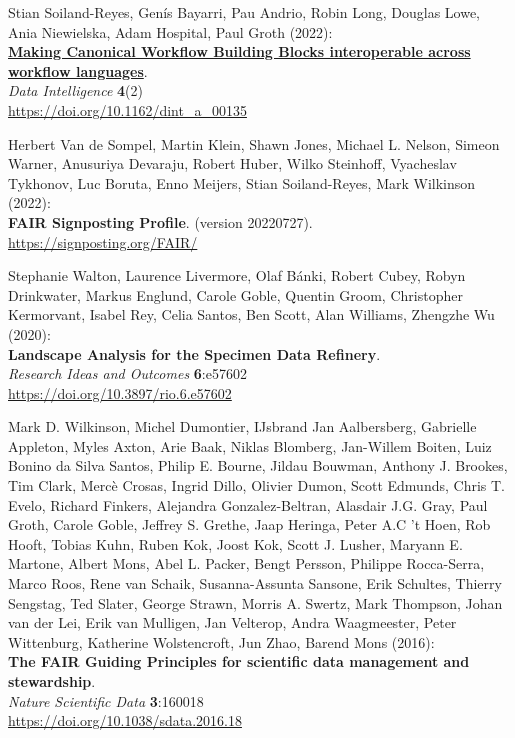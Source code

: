 \begin{thebibliography}{9}
 Stian Soiland-Reyes, Genís Bayarri, Pau
Andrio, Robin Long, Douglas Lowe, Ania Niewielska, Adam Hospital, Paul
Groth (2022):\\
\href{../canonical-workflow-building-blocks/}{\textbf{Making Canonical
Workflow Building Blocks interoperable across workflow languages}}.\\
\emph{Data Intelligence} \textbf{4}(2)\\
\url{https://doi.org/10.1162/dint_a_00135}

 Herbert Van de Sompel, Martin Klein, Shawn
Jones, Michael L. Nelson, Simeon Warner, Anusuriya Devaraju, Robert
Huber, Wilko Steinhoff, Vyacheslav Tykhonov, Luc Boruta, Enno Meijers,
Stian Soiland-Reyes, Mark Wilkinson (2022):\\
\textbf{FAIR Signposting Profile}. (version 20220727).\\
\url{https://signposting.org/FAIR/}

 Stephanie Walton, Laurence Livermore, Olaf Bánki,
Robert Cubey, Robyn Drinkwater, Markus Englund, Carole Goble, Quentin
Groom, Christopher Kermorvant, Isabel Rey, Celia Santos, Ben Scott, Alan
Williams, Zhengzhe Wu (2020):\\
\textbf{Landscape Analysis for the Specimen Data Refinery}.\\
\emph{Research Ideas and Outcomes} \textbf{6}:e57602\\
\url{https://doi.org/10.3897/rio.6.e57602}

 Mark D. Wilkinson, Michel Dumontier, IJsbrand Jan
Aalbersberg, Gabrielle Appleton, Myles Axton, Arie Baak, Niklas
Blomberg, Jan-Willem Boiten, Luiz Bonino da Silva Santos, Philip E.
Bourne, Jildau Bouwman, Anthony J. Brookes, Tim Clark, Mercè Crosas,
Ingrid Dillo, Olivier Dumon, Scott Edmunds, Chris T. Evelo, Richard
Finkers, Alejandra Gonzalez-Beltran, Alasdair J.G. Gray, Paul Groth,
Carole Goble, Jeffrey S. Grethe, Jaap Heringa, Peter A.C 't Hoen, Rob
Hooft, Tobias Kuhn, Ruben Kok, Joost Kok, Scott J. Lusher, Maryann E.
Martone, Albert Mons, Abel L. Packer, Bengt Persson, Philippe
Rocca-Serra, Marco Roos, Rene van Schaik, Susanna-Assunta Sansone, Erik
Schultes, Thierry Sengstag, Ted Slater, George Strawn, Morris A. Swertz,
Mark Thompson, Johan van der Lei, Erik van Mulligen, Jan Velterop, Andra
Waagmeester, Peter Wittenburg, Katherine Wolstencroft, Jun Zhao, Barend
Mons (2016):\\
\textbf{The FAIR Guiding Principles for scientific data management and
stewardship}.\\
\emph{Nature Scientific Data} \textbf{3}:160018\\
\url{https://doi.org/10.1038/sdata.2016.18}


\end{thebibliography}
